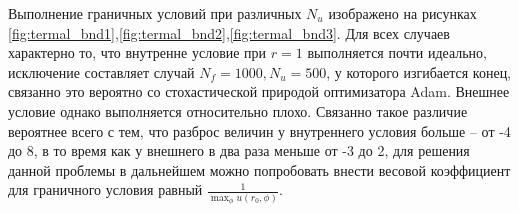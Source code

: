 \documentclass[a4paper,14pt]{extarticle} %
\begin{document}
Выполнение граничных условий при различных $N_u$ изображено на рисунках \ref{fig:termal_bnd1},\ref{fig:termal_bnd2},\ref{fig:termal_bnd3}. Для всех случаев характерно то, что внутренне условие при $r=1$ выполняется почти идеально, исключение составляет случай $N_f=1000, N_u = 500$, у которого изгибается конец, связанно это вероятно со стохастической природой оптимизатора Adam. Внешнее условие однако выполняется относительно плохо. Связанно такое различие вероятнее всего с тем, что разброс величин у внутреннего условия больше -- от -4 до 8, в то время как у внешнего в два раза меньше от -3 до 2, для решения данной проблемы в дальнейшем можно попробовать внести весовой коэффициент для граничного условия равный $\frac{1}{\max_\phi{u(r_0, \phi)}}$.

\end{document}
